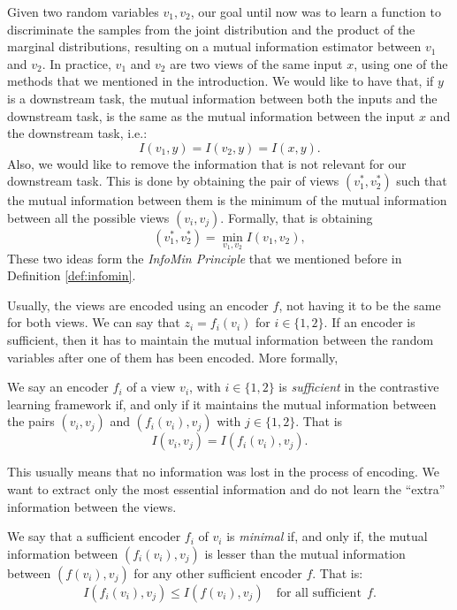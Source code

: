 Given two random variables $v_1,v_2$, our goal until now was to learn a function to discriminate the samples from the joint distribution and the product of the marginal distributions, resulting on a mutual information estimator between $v_1$ and $v_2$. In practice, $v_1$ and $v_2$ are two views of the same input $x$, using one of the methods that we mentioned in the introduction. We would like to have that, if $y$ is a downstream task, the mutual information between both the inputs and the downstream task, is the same as the mutual information between the input $x$ and the downstream task, i.e.:
\[
I(v_1,y) = I(v_2,y) = I(x,y).  
\]
Also, we would like to remove the information that is not relevant for our downstream task. This is done by obtaining the pair of views $(v_1^*,v_2^*)$ such that the mutual information between them is the minimum of the mutual information between all the possible views $(v_i,v_j)$. Formally, that is obtaining
\[
(v_1^*, v_2^*) = \min_{v_1,v_2} I (v_1,v_2),    
\]
These two ideas form the \emph{InfoMin Principle} that we mentioned before in Definition \ref{def:infomin}.

Usually, the views are encoded using an encoder $f$, not having it to be the same for both views. We can say that $z_i = f_i(v_i)$ for $i \in \{1,2\}$. If an encoder is sufficient, then it has to maintain the mutual information between the random variables after one of them has been encoded. More formally,

\begin{ndef}
We say an encoder $f_i$ of a view $v_i$, with $i \in \{1,2\}$ is \emph{sufficient} in the contrastive learning framework if, and only if it maintains the mutual information between the pairs $(v_i,v_j)$ and $(f_i(v_i),v_j)$ with $j \in \{1,2\}$. That is
\[
I(v_i,v_j) = I(f_i(v_i),v_j).    
\]
\end{ndef}
This usually means that no information was lost in the process of encoding. We want to extract only the most essential information and do not learn the ``extra'' information between the views.
\begin{ndef}
We say that a sufficient encoder $f_i$ of $v_i$ is \emph{minimal} if, and only if, the mutual information between $(f_i(v_i),v_j)$ is lesser than the mutual information between $(f(v_i),v_j)$ for any other sufficient encoder $f$. That is:
\[
I(f_i(v_i),v_j) \leq I(f(v_i),v_j) \quad \text{for all sufficient}\ \ f. 
\]
\end{ndef}

